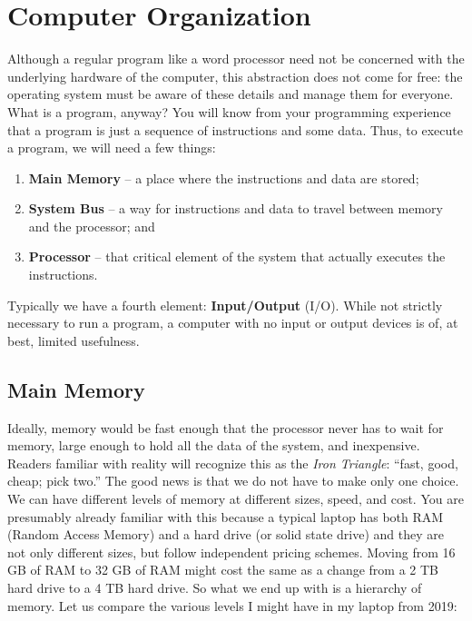 




\section*{Computer Organization}
Although a regular program like a word processor need not be concerned with the underlying hardware of the computer, this abstraction does not come for free: the operating system must be aware of these details and manage them for everyone. What is a program, anyway? You will know from your programming experience that a program is just a sequence of instructions and some data. Thus, to execute a program, we will need a few things:

\begin{enumerate}
	\item \textbf{Main Memory} -- a place where the instructions and data are stored;
	\item \textbf{System Bus} -- a way for instructions and data to travel between memory and the processor; and
	\item \textbf{Processor} -- that critical element of the system that actually executes the instructions.
\end{enumerate}

Typically we have a fourth element: \textbf{Input/Output} (I/O). While not strictly necessary to run a program, a computer with no input or output devices is of, at best, limited usefulness.

\subsection*{Main Memory}
Ideally, memory would be fast enough that the processor never has to wait for memory, large enough to hold all the data of the system, and inexpensive. Readers familiar with reality will recognize this as the \textit{Iron Triangle}: ``fast, good, cheap; pick two.'' The good news is that we do not have to make only one choice. We can have different levels of memory at different sizes, speed, and cost. You are presumably already familiar with this because a typical laptop has both RAM (Random Access Memory) and a hard drive (or solid state drive) and they are not only different sizes, but follow independent pricing schemes. Moving from 16 GB of RAM to 32 GB of RAM might cost the same as a change from a 2 TB hard drive to a 4 TB hard drive. So what we end up with is a hierarchy of memory. Let us compare the various levels I might have in my laptop from 2019:


